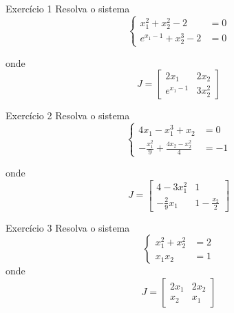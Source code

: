 \begin{frame}{Exercício 1}
    Resolva o sistema
    \[
        \begin{cases}
            x_1^2 +x_2^2-2 &= 0 \\
            e^{x_1-1}+x_2^3-2 & = 0
        \end{cases}
    \]

    onde
    \[
        J=
        \begin{bmatrix}
            2x_1 & 2x_2 \\
            e^{x_1-1} & 3x_2^2
        \end{bmatrix}
    \]

\end{frame}

\begin{frame}{Exercício 2}
    Resolva o sistema
    \[
        \begin{cases}
            4x_1 - x_1^3+x_2 &= 0 \\
            -\frac{x_1^2}{9} + \frac{4x_2 - x_2^2}{4} & = -1
        \end{cases}
    \]

    onde
    \[
        J=
        \begin{bmatrix}
            4-3x_1^2 & 1 \\
            -\frac{2}{9}x_1 & 1-\frac{x_2}{2}
        \end{bmatrix}
    \]

\end{frame}

\begin{frame}{Exercício 3}
    Resolva o sistema
    \[
        \begin{cases}
            x_1^2+x_2^2&=2 \\
            x_1 x_2 &=1
        \end{cases}
    \]
    onde
    \[
        J=
        \begin{bmatrix}
            2x_1 & 2x_2 \\
            x_2 & x_1
        \end{bmatrix}
    \]

\end{frame}


